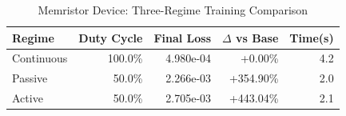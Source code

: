\begin{table}[htbp]
\centering
\caption{Memristor Device: Three-Regime Training Comparison}
\label{tab:memristor_regimes}
\begin{tabular}{lrrrr}
\hline
Regime & Duty Cycle & Final Loss & $\Delta$ vs Base & Time(s) \\
\hline
Continuous & 100.0\% & 4.980e-04 & +0.00\% & 4.2 \\
Passive & 50.0\% & 2.266e-03 & +354.90\% & 2.0 \\
Active & 50.0\% & 2.705e-03 & +443.04\% & 2.1 \\
\hline
\end{tabular}
\end{table}

